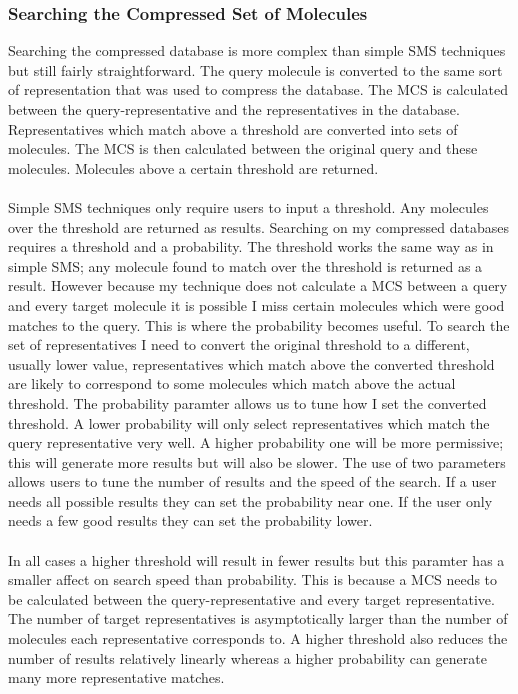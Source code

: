 \documentclass[DIV=calc, paper=a4, fontsize=12pt, twocolumn]{scrartcl}	 %
\begin{document}
\subsubsection*{Searching the Compressed Set of Molecules}
Searching the compressed database is more complex than simple SMS techniques but still fairly straightforward. The query molecule is converted to the same sort of representation that was used to compress the database. The MCS is calculated between the query-representative and the representatives in the database. Representatives which match above a threshold are converted into sets of molecules. The MCS is then calculated between the original query and these molecules. Molecules above a certain threshold are returned.
\\\\
Simple SMS techniques only require users to input a threshold. Any molecules over the threshold are returned as results. Searching on my compressed databases requires a threshold and a probability. The threshold works the same way as in simple SMS; any molecule found to match over the threshold is returned as a result. However because my technique does not calculate a MCS between a query and every target molecule it is possible I miss certain molecules which were good matches to the query. This is where the probability becomes useful. To search the set of representatives I need to convert the original threshold to a different, usually lower value, representatives which match above the converted threshold are likely to correspond to some molecules which match above the actual threshold. The probability paramter allows us to tune how I set the converted threshold. A lower probability will only select representatives which match the query representative very well. A higher probability one will be more permissive; this will generate more results but will also be slower. The use of two parameters allows users to tune the number of results and the speed of the search. If a user needs all possible results they can set the probability near one. If the user only needs a few good results they can set the probability lower.
\\\\
In all cases a higher threshold will result in fewer results but this paramter has a smaller affect on search speed than probability. This is because a MCS needs to be calculated between the query-representative and every target representative. The number of target representatives is asymptotically larger than the number of molecules each representative corresponds to. A higher threshold also reduces the number of results relatively linearly whereas a higher probability can generate many more representative matches.
\end{document}
